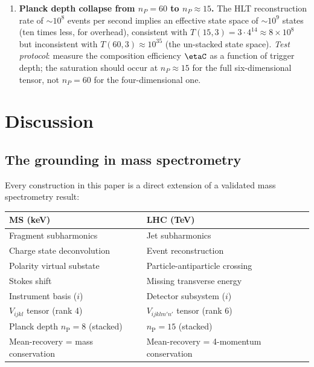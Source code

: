 \documentclass[twocolumn,10pt,a4paper]{article}
\theoremstyle{thmstyle}
\theoremstyle{definition}
\theoremstyle{remark}
\newcommand{\nP}{n_{\mathrm{P}}}
\begin{document}
\begin{enumerate}[nosep,label=\textbf{P\arabic*.}]
\item \textbf{Planck depth collapse from $n_P = 60$ to $n_P \approx 15$.}
The HLT reconstruction rate of $\sim 10^8$ events per second implies an
effective state space of $\sim 10^9$ states (ten times less, for overhead),
consistent with $T(15,3) = 3\cdot 4^{14} \approx 8\times10^8$ but
inconsistent with $T(60,3) \approx 10^{35}$ (the un-stacked state space).
\emph{Test protocol}: measure the composition efficiency $\etaC$ as a
function of trigger depth; the saturation should occur at $n_P \approx 15$
for the full six-dimensional tensor, not $n_P = 60$ for the four-dimensional
one.

\end{enumerate}

\section{Discussion}
\label{sec:discussion}

\subsection{The grounding in mass spectrometry}

Every construction in this paper is a direct extension of a validated
mass spectrometry result:

\begin{center}\small
\begin{tabular}{p{3.8cm}p{3.8cm}}
\toprule
\textbf{MS (keV)} & \textbf{LHC (TeV)} \\
\midrule
Fragment subharmonics & Jet subharmonics \\
Charge state deconvolution & Event reconstruction \\
Polarity virtual substate & Particle-antiparticle crossing \\
Stokes shift & Missing transverse energy \\
Instrument basis ($i$) & Detector subsystem ($i$) \\
$V_{ijkl}$ tensor (rank 4) & $V_{ijklm'n'}$ tensor (rank 6) \\
Planck depth $\nP = 8$ (stacked) & $\nP = 15$ (stacked) \\
Mean-recovery = mass conservation & Mean-recovery = 4-momentum conservation \\
\bottomrule
\end{tabular}
\end{center}
\end{document}
